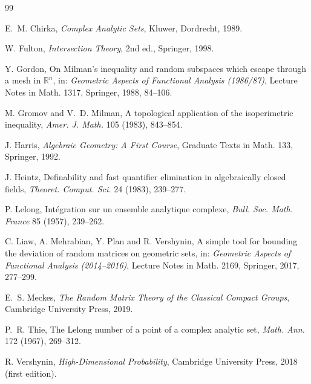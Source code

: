 \documentclass[11pt]{article}
\newcommand{\R}{\mathbb{R}}
\begin{document}
\begin{thebibliography}{99}

E.~M. Chirka, \emph{Complex Analytic Sets}, Kluwer, Dordrecht, 1989.

W. Fulton, \emph{Intersection Theory}, 2nd ed., Springer, 1998.

Y. Gordon, On Milman's inequality and random subspaces which escape through a mesh in $\R^n$, in: \emph{Geometric Aspects of Functional Analysis (1986/87)}, Lecture Notes in Math. 1317, Springer, 1988, 84--106.

M. Gromov and V.~D. Milman, A topological application of the isoperimetric inequality, \emph{Amer. J. Math.} 105 (1983), 843--854.

J. Harris, \emph{Algebraic Geometry: A First Course}, Graduate Texts in Math. 133, Springer, 1992.

J. Heintz, Definability and fast quantifier elimination in algebraically closed fields, \emph{Theoret. Comput. Sci.} 24 (1983), 239--277.

P. Lelong, Int\'egration sur un ensemble analytique complexe, \emph{Bull. Soc. Math. France} 85 (1957), 239--262.

C. Liaw, A. Mehrabian, Y. Plan and R. Vershynin, A simple tool for bounding the deviation of random matrices on geometric sets, in: \emph{Geometric Aspects of Functional Analysis (2014--2016)}, Lecture Notes in Math. 2169, Springer, 2017, 277--299.

E.~S. Meckes, \emph{The Random Matrix Theory of the Classical Compact Groups}, Cambridge University Press, 2019.

P.~R. Thie, The Lelong number of a point of a complex analytic set, \emph{Math. Ann.} 172 (1967), 269--312.

R. Vershynin, \emph{High-Dimensional Probability}, Cambridge University Press, 2018 (first edition).

\end{thebibliography}
\end{document}
